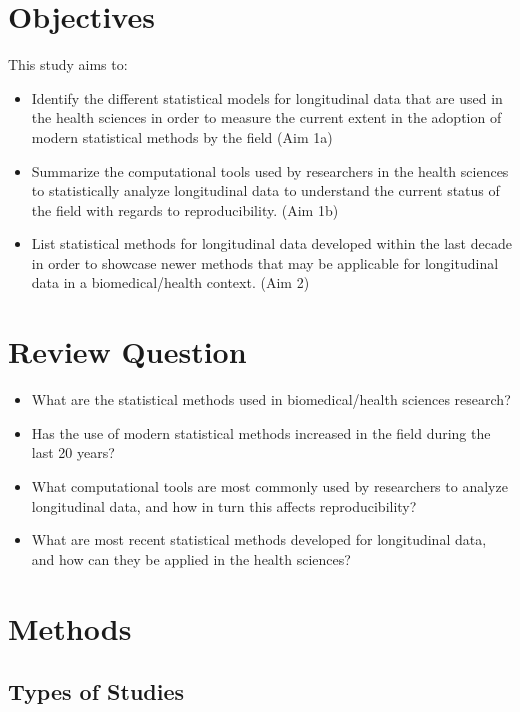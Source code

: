 \documentclass[
]{article}
\begin{document}
\hypertarget{objectives}{%
\section{Objectives}\label{objectives}}

This study aims to:

\begin{itemize}
\item
  Identify the different statistical models for longitudinal data that
  are used in the health sciences in order to measure the current extent
  in the adoption of modern statistical methods by the field (Aim 1a)
\item
  Summarize the computational tools used by researchers in the health
  sciences to statistically analyze longitudinal data to understand the
  current status of the field with regards to reproducibility. (Aim 1b)
\item
  List statistical methods for longitudinal data developed within the
  last decade in order to showcase newer methods that may be applicable
  for longitudinal data in a biomedical/health context. (Aim 2)
\end{itemize}

\hypertarget{review-question}{%
\section{Review Question}\label{review-question}}

\begin{itemize}
\item
  What are the statistical methods used in biomedical/health sciences
  research?
\item
  Has the use of modern statistical methods increased in the field
  during the last 20 years?
\item
  What computational tools are most commonly used by researchers to
  analyze longitudinal data, and how in turn this affects
  reproducibility?
\item
  What are most recent statistical methods developed for longitudinal
  data, and how can they be applied in the health sciences?
\end{itemize}

\hypertarget{methods}{%
\section{Methods}\label{methods}}

\hypertarget{types-of-studies}{%
\subsection{Types of Studies}\label{types-of-studies}}
\end{document}
